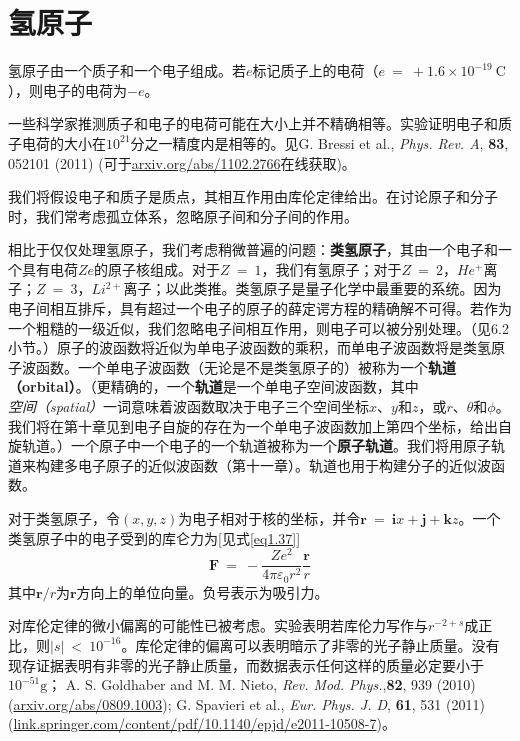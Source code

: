 \documentclass[12pt,a4paper,openany]{ctexbook}
\newcommand{\abs}[1]{\left| #1 \right|}
\begin{document}
\section{氢原子}
\begin{flushleft}
    \setlength{\parindent}{2em}
氢原子由一个质子和一个电子组成。若$e$标记质子上的电荷（$e\ =\ +1.6\times10^{-19}\ \mathrm{C}$），则电子的电荷为$-e$。
\begin{center}
    \small
    \begin{minipage}{0.8\textwidth}
    一些科学家推测质子和电子的电荷可能在大小上并不精确相等。实验证明电子和质子电荷的大小在$10^{21}$分之一精度内是相等的。见G. Bressi et al., \textit{Phys. Rev. A}, \textbf{83}, 052101 (2011) (可于\url{arxiv.org/abs/1102.2766}在线获取)。
    \end{minipage}
\end{center}


我们将假设电子和质子是质点，其相互作用由库伦定律给出。在讨论原子和分子时，我们常考虑孤立体系，忽略原子间和分子间的作用。

相比于仅仅处理氢原子，我们考虑稍微普遍的问题：\textbf{类氢原子}，其由一个电子和一个具有电荷$Ze$的原子核组成。对于$Z\ =\ 1$，我们有氢原子；对于$Z\ =\ 2$，$He^+$离子；$Z\ =\ 3$，$Li^{2+}$离子；以此类推。类氢原子是量子化学中最重要的系统。因为电子间相互排斥，具有超过一个电子的原子的薛定谔方程的精确解不可得。若作为一个粗糙的一级近似，我们忽略电子间相互作用，则电子可以被分别处理。（见6.2小节。）原子的波函数将近似为单电子波函数的乘积，而单电子波函数将是类氢原子波函数。一个单电子波函数（无论是不是类氢原子的）被称为一个\textbf{轨道（orbital）}。（更精确的，一个\textbf{轨道}是一个单电子空间波函数，其中\textit{空间（spatial）}一词意味着波函数取决于电子三个空间坐标$x$、$y$和$z$，或$r$、$\theta$和$\phi$。我们将在第十章见到电子自旋的存在为一个单电子波函数加上第四个坐标，给出自旋轨道。）一个原子中一个电子的一个轨道被称为一个\textbf{原子轨道}。我们将用原子轨道来构建多电子原子的近似波函数（第十一章）。轨道也用于构建分子的近似波函数。

对于类氢原子，令$(x,y,z)$为电子相对于核的坐标，并令$\boldsymbol{r}\ =\ \boldsymbol{i}x+\boldsymbol{j}+\boldsymbol{k}z$。一个类氢原子中的电子受到的库仑力为[见式\eqref{eq1.37}]
\begin{equation}
    \boldsymbol{F}\ =\ -\frac{Ze^2}{4\pi\varepsilon_0r^2}\frac{\boldsymbol{r}}{r} \label{eq6.56}
\end{equation}
其中$\boldsymbol{r}/r$为$\boldsymbol{r}$方向上的单位向量。负号表示为吸引力。
\begin{center}
    \small
    \begin{minipage}{0.8\textwidth}
        对库伦定律的微小偏离的可能性已被考虑。实验表明若库伦力写作与$r^{-2+s}$成正比，则$\abs{s}\ <\ 10^{-16}$。库伦定律的偏离可以表明暗示了非零的光子静止质量。没有现存证据表明有非零的光子静止质量，而数据表示任何这样的质量必定要小于$10^{-51} \mathrm{g}$； A. S. Goldhaber and M. M. Nieto, \textit{Rev. Mod. Phys.},\textbf{82}, 939 (2010) (\url{arxiv.org/abs/0809.1003}); G. Spavieri et al., \textit{Eur. Phys. J. D}, \textbf{61}, 531 (2011) (\url{link.springer.com/content/pdf/10.1140/epjd/e2011-10508-7})。
    \end{minipage}
\end{center}


\end{flushleft}
\end{document}
